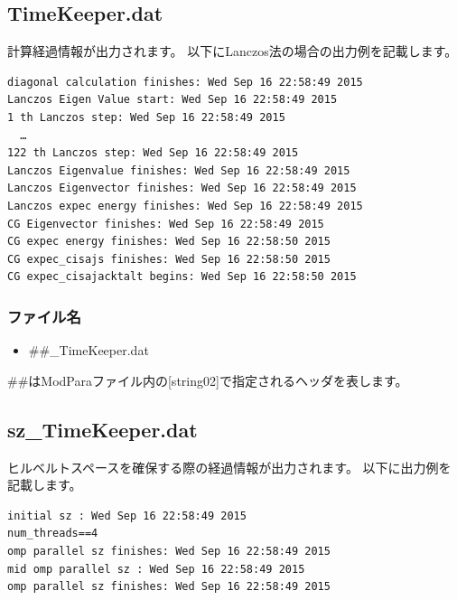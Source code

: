 \newpage
\subsection{TimeKeeper.dat}
計算経過情報が出力されます。
以下にLanczos法の場合の出力例を記載します。

\begin{minipage}{12.5cm}
\begin{screen}
\begin{verbatim}
diagonal calculation finishes: Wed Sep 16 22:58:49 2015
Lanczos Eigen Value start: Wed Sep 16 22:58:49 2015
1 th Lanczos step: Wed Sep 16 22:58:49 2015
  …
122 th Lanczos step: Wed Sep 16 22:58:49 2015
Lanczos Eigenvalue finishes: Wed Sep 16 22:58:49 2015
Lanczos Eigenvector finishes: Wed Sep 16 22:58:49 2015
Lanczos expec energy finishes: Wed Sep 16 22:58:49 2015
CG Eigenvector finishes: Wed Sep 16 22:58:49 2015
CG expec energy finishes: Wed Sep 16 22:58:50 2015
CG expec_cisajs finishes: Wed Sep 16 22:58:50 2015
CG expec_cisajacktalt begins: Wed Sep 16 22:58:50 2015
\end{verbatim}
\end{screen}
\end{minipage}

\subsubsection{ファイル名}
 \begin{itemize}
   \item  \#\#\_TimeKeeper.dat
  \end{itemize}
  \#\#はModParaファイル内の[string02]で指定されるヘッダを表します。


\subsection{sz\_TimeKeeper.dat}
ヒルベルトスペースを確保する際の経過情報が出力されます。
以下に出力例を記載します。

\begin{minipage}{12.5cm}
\begin{screen}
\begin{verbatim}
initial sz : Wed Sep 16 22:58:49 2015
num_threads==4
omp parallel sz finishes: Wed Sep 16 22:58:49 2015
mid omp parallel sz : Wed Sep 16 22:58:49 2015
omp parallel sz finishes: Wed Sep 16 22:58:49 2015
\end{verbatim}
\end{screen}
\end{minipage}
